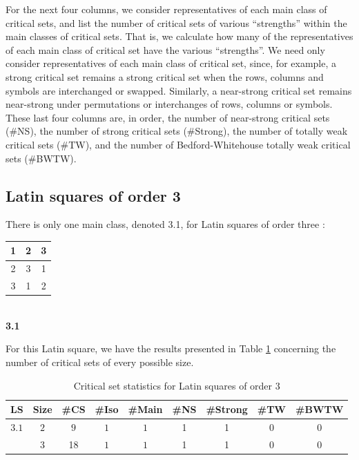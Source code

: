 
For the next four columns, we consider representatives of each main
class of critical sets, and list the number of critical sets of various
``strengths'' within the main classes of critical sets.  That is,
we calculate how many of the representatives of each main class of
critical set have the various ``strengths''.  We need only consider
representatives of each main class of critical set, since, for example,
a strong critical set remains a strong critical set when the rows, columns and
symbols are interchanged or swapped.  Similarly, a 
near-strong critical set remains near-strong  under
permutations or interchanges of rows, columns or symbols.
These last four columns are, in order, the number of 
near-strong critical sets (\#NS), the number of strong critical sets
(\#Strong), the number of totally weak critical sets (\#TW), and the
number of Bedford-Whitehouse totally weak critical sets (\#BWTW).
\subsection{Latin squares of order 3}

There is only one main class, denoted 3.1, for Latin squares of order three \cite{crc}: 
\vspace{5mm}

\begin{center}
\begin{tabular}{|c|c|c|} \hline
1&2&3 \\ \hline
2&3&1 \\ \hline
3&1&2 \\ \hline
\end{tabular} \vspace{3mm}\\
{\bf 3.1}
\end{center}
\vspace{5mm}

For this Latin square, we have the results presented in Table \ref{one} 
concerning the number of critical sets of every possible size.

\begin{table}
\begin{center}
\caption{Critical set statistics for Latin squares of order 3}
\label{one}
\begin{tabular}{|c|c|c|c|c|c|c|c|c|} \hline
LS & Size & \#CS & \#Iso & \#Main & \#NS & \#Strong & \#TW & \#BWTW \\ \hline
$3.1$  & $2$ & $9$ & $1$ & $1$ & 1 & 1 & 0 & 0  \\
& $3$ & 18 & $1$ & $1$ & 1 & 1 & 0 & 0 \\ \hline
\end{tabular}\vspace {3mm} \\
\end{center}
\end{table}

